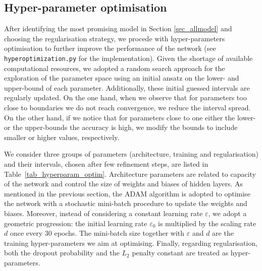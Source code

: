 \documentclass{article}
\begin{document}
\subsection{Hyper-parameter optimisation}
After identifying  the most promising model in Section \ref{sec_allmodel} and choosing the  regularisation strategy, we procede with hyper-parameters optimisation to further improve the performance of the network (see \verb|hyperoptimization.py| for the implementation). 
 Given the shortage of available computational resources, we adopted a random search approach for the exploration of the parameter space using an initial ansatz  on the lower- and upper-bound of each parameter.
 Additionally,  these initial guessed intervals are regularly updated.
 On the one hand, when we observe that for parameters too close to boundaries we do not reach convergence, we reduce the interval spread.
 On the other hand, if we notice that for parameters close to one either the lower- or the upper-bounds the accuracy is high, we modify the bounds to include smaller or higher values, respectively. 

We consider three groups of  parameters (architecture, training and regularisation) and their intervals, chosen after few refinement steps, are listed in Table~\ref{tab_hyperparam_optim}.  
 Architecture parameters are related to capacity of the network and control the size of weights and biases of hidden layers.
 As mentioned in the previous section, the ADAM algorithm is adopted to optimise the network with a stochastic mini-batch procedure to update the weights and biases. 
Moreover,  instead of considering a constant learning rate $\varepsilon$, we adopt a geometric progression: the initial learning rate $\varepsilon_0$ is multiplied by the scaling rate $d$ once every 30 epochs. 
The  mini-batch size  together with $\varepsilon$ and $d$ are the training   hyper-parameters we aim at optimising. 
Finally, regarding regularisation, both the dropout probability and the $L_2$ penalty constant are treated as hyper-parameters.
 
\end{document}
